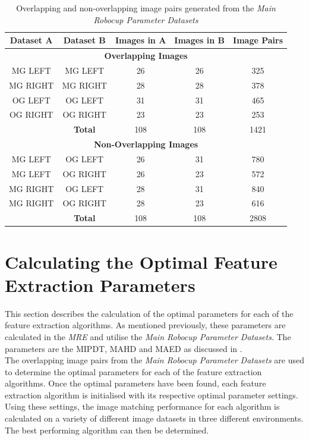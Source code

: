 \documentclass[11pt]{report}
\begin{document}
\begin{table}
\caption{Overlapping and non-overlapping image pairs generated from the \textit{Main Robocup Parameter Datasets} }
\begin{tabular}{|c|c|c|c|c|}
\hline 
\textbf{Dataset A} & \textbf{Dataset B} & \textbf{Images in A} & \textbf{Images in B} & \textbf{Image Pairs}\tabularnewline
\hline 
\hline 
\multicolumn{5}{|c}{\textbf{Overlapping Images}}\tabularnewline
\hline 
MG LEFT & MG LEFT & 26 & 26 & 325\tabularnewline
\hline 
MG RIGHT & MG RIGHT & 28 & 28 & 378\tabularnewline
\hline 
OG LEFT & OG LEFT & 31 & 31 & 465\tabularnewline
\hline 
OG RIGHT & OG RIGHT & 23 & 23 & 253\tabularnewline
\hline 
 & \textbf{Total} & 108 & 108 & 1421\tabularnewline
\hline 
\multicolumn{5}{|c}{\textbf{Non-Overlapping Images}}\tabularnewline
\hline 
MG LEFT & OG LEFT & 26 & 31 & 780\tabularnewline
\hline 
MG LEFT & OG RIGHT & 26 & 23 & 572\tabularnewline
\hline 
MG RIGHT & OG LEFT & 28 & 31 & 840\tabularnewline
\hline 
MG RIGHT & OG RIGHT & 28 & 23 & 616\tabularnewline
\hline 
 & \textbf{Total} & 108 & 108 & 2808\tabularnewline
\hline 
\end{tabular}
\label{tab:mrpd}
\end{table}

\section{Calculating the Optimal Feature Extraction Parameters}
\label{sec:optimalParameters}
This section describes the calculation of the optimal parameters for each of the feature extraction algorithms. As mentioned previously, these parameters are calculated in the \textit{MRE} and utilise the \textit{Main Robocup Parameter Datasets}. The parameters are the MIPDT, MAHD and MAED as discussed in .\\

The overlapping image pairs from the \textit{Main Robocup Parameter Datasets} are used to determine the optimal parameters for each of the feature extraction algorithms. Once the optimal parameters have been found, each feature extraction algorithm is initialised with its respective optimal parameter settings. Using these settings, the image matching performance for each algorithm is calculated on a variety of different image datasets in three different environments. The best performing algorithm can then be determined.\\
\end{document}
